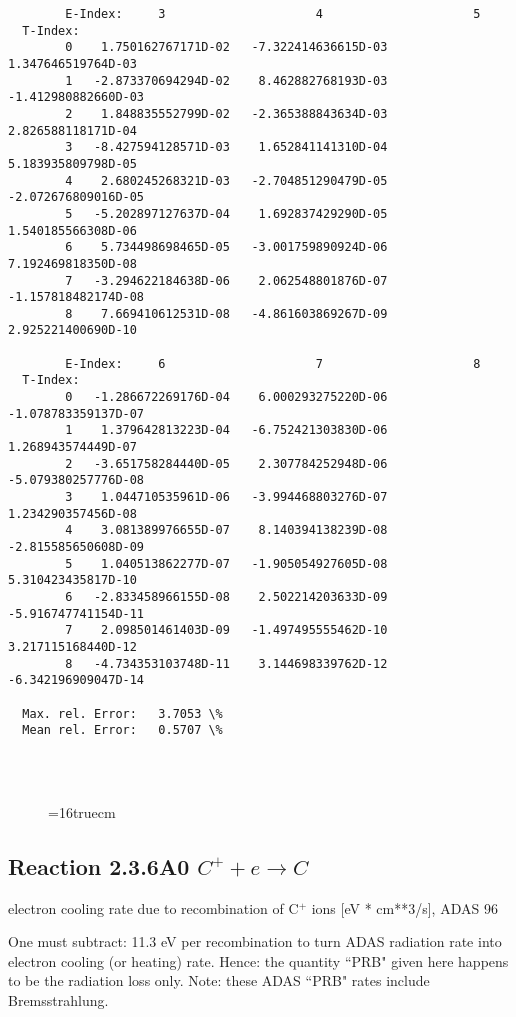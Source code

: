 \documentclass[12pt,dvipdfmx]{article}
\begin{document}
{\begin{small}
\begin{verbatim}
        E-Index:     3                     4                     5
  T-Index:
        0    1.750162767171D-02   -7.322414636615D-03    1.347646519764D-03
        1   -2.873370694294D-02    8.462882768193D-03   -1.412980882660D-03
        2    1.848835552799D-02   -2.365388843634D-03    2.826588118171D-04
        3   -8.427594128571D-03    1.652841141310D-04    5.183935809798D-05
        4    2.680245268321D-03   -2.704851290479D-05   -2.072676809016D-05
        5   -5.202897127637D-04    1.692837429290D-05    1.540185566308D-06
        6    5.734498698465D-05   -3.001759890924D-06    7.192469818350D-08
        7   -3.294622184638D-06    2.062548801876D-07   -1.157818482174D-08
        8    7.669410612531D-08   -4.861603869267D-09    2.925221400690D-10

        E-Index:     6                     7                     8
  T-Index:
        0   -1.286672269176D-04    6.000293275220D-06   -1.078783359137D-07
        1    1.379642813223D-04   -6.752421303830D-06    1.268943574449D-07
        2   -3.651758284440D-05    2.307784252948D-06   -5.079380257776D-08
        3    1.044710535961D-06   -3.994468803276D-07    1.234290357456D-08
        4    3.081389976655D-07    8.140394138239D-08   -2.815585650608D-09
        5    1.040513862277D-07   -1.905054927605D-08    5.310423435817D-10
        6   -2.833458966155D-08    2.502214203633D-09   -5.916747741154D-11
        7    2.098501461403D-09   -1.497495555462D-10    3.217115168440D-12
        8   -4.734353103748D-11    3.144698339762D-12   -6.342196909047D-14

  Max. rel. Error:   3.7053 \%
  Mean rel. Error:   0.5707 \%




\end{verbatim}\end{small}
\begin{figure} \label{2.8il}
\epsfxsize=16truecm 
\end{figure}
\newpage

\subsection{
  Reaction 2.3.6A0  $C^+ + e \rightarrow C  $
}
electron cooling rate due to recombination of C$^+$ ions [eV * cm**3/s],
ADAS 96

One must subtract: 11.3 eV per recombination to turn ADAS radiation
rate into electron cooling (or heating) rate. Hence: the quantity
``PRB" given here happens to be the radiation loss only. Note: these
ADAS ``PRB" rates include Bremsstrahlung.

}
\end{document}
